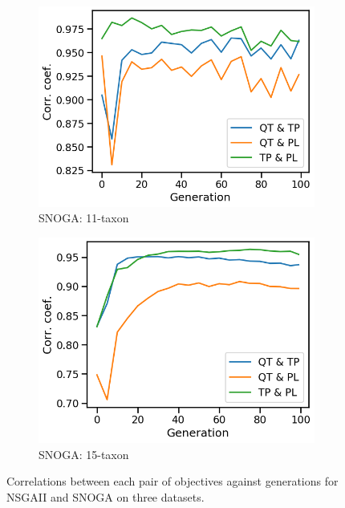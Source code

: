 \begin{figure}[!htbp]
\begin{subfigure}[b]{0.33\textwidth}
			\includegraphics[width=\textwidth]{Figure/11-taxon_NOSSGA_corr_plot}
			\caption{SNOGA: 11-taxon}
\end{subfigure}\begin{subfigure}[b]{0.33\textwidth}
			\includegraphics[width=\textwidth]{Figure/15-taxon_NOSSGA_corr_plot}
			\caption{SNOGA: 15-taxon}
\end{subfigure}
		\caption{Correlations between each pair of objectives against generations for NSGAII and SNOGA on three datasets.}
		\label{fig:gen_wise_correlation}
\end{figure}

